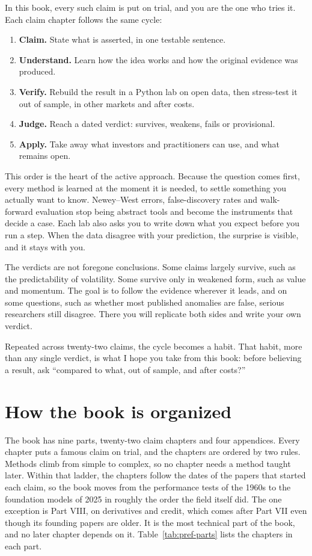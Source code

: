 In this book, every such claim is put on trial, and you are the one who tries it. Each claim chapter follows the same cycle:

\begin{enumerate}
  \item \textbf{Claim.} State what is asserted, in one testable sentence.
  \item \textbf{Understand.} Learn how the idea works and how the original evidence was produced.
  \item \textbf{Verify.} Rebuild the result in a Python lab on open data, then stress-test it out of sample, in other markets and after costs.
  \item \textbf{Judge.} Reach a dated verdict: survives, weakens, fails or provisional.
  \item \textbf{Apply.} Take away what investors and practitioners can use, and what remains open.
\end{enumerate}

This order is the heart of the active approach. Because the question comes first, every method is learned at the moment it is needed, to settle something you actually want to know. Newey--West errors, false-discovery rates and walk-forward evaluation stop being abstract tools and become the instruments that decide a case. Each lab also asks you to write down what you expect before you run a step. When the data disagree with your prediction, the surprise is visible, and it stays with you.

The verdicts are not foregone conclusions. Some claims largely survive, such as the predictability of volatility. Some survive only in weakened form, such as value and momentum. The goal is to follow the evidence wherever it leads, and on some questions, such as whether most published anomalies are false, serious researchers still disagree. There you will replicate both sides and write your own verdict.

Repeated across twenty-two claims, the cycle becomes a habit. That habit, more than any single verdict, is what I hope you take from this book: before believing a result, ask ``compared to what, out of sample, and after costs?''

\section*{How the book is organized}

The book has nine parts, twenty-two claim chapters and four appendices. Every chapter puts a famous claim on trial, and the chapters are ordered by two rules. Methods climb from simple to complex, so no chapter needs a method taught later. Within that ladder, the chapters follow the dates of the papers that started each claim, so the book moves from the performance tests of the 1960s to the foundation models of 2025 in roughly the order the field itself did. The one exception is Part VIII, on derivatives and credit, which comes after Part VII even though its founding papers are older. It is the most technical part of the book, and no later chapter depends on it.
Table~\ref{tab:pref-parts} lists the chapters in each part.

